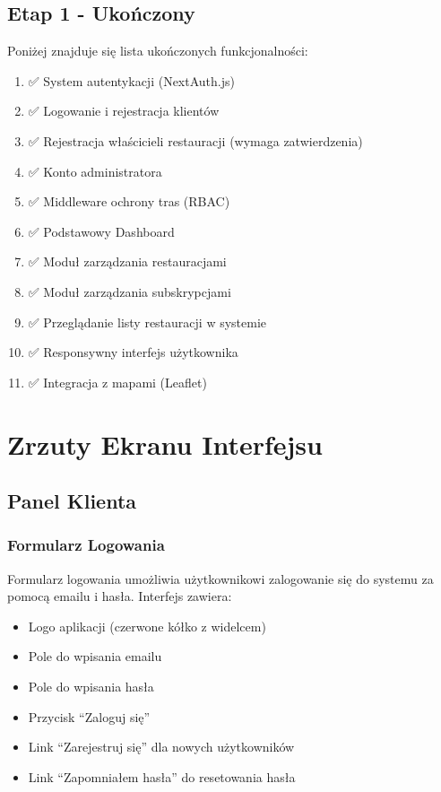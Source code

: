 ﻿\documentclass[12pt,a4paper,utf-8]{article}
\begin{document}
\subsection{Etap 1 - Ukończony}

Poniżej znajduje się lista ukończonych funkcjonalności:

\begin{enumerate}
    \item ✅ System autentykacji (NextAuth.js)
    \item ✅ Logowanie i rejestracja klientów
    \item ✅ Rejestracja właścicieli restauracji (wymaga zatwierdzenia)
    \item ✅ Konto administratora
    \item ✅ Middleware ochrony tras (RBAC)
    \item ✅ Podstawowy Dashboard
    \item ✅ Moduł zarządzania restauracjami
    \item ✅ Moduł zarządzania subskrypcjami
    \item ✅ Przeglądanie listy restauracji w systemie
    \item ✅ Responsywny interfejs użytkownika
    \item ✅ Integracja z mapami (Leaflet)


\end{enumerate}

\newpage

\section{Zrzuty Ekranu Interfejsu}

\subsection{Panel Klienta}

\subsubsection{Formularz Logowania}

Formularz logowania umożliwia użytkownikowi zalogowanie się do systemu za pomocą emailu i hasła. Interfejs zawiera:

\begin{itemize}
    \item Logo aplikacji (czerwone kółko z widelcem)
    \item Pole do wpisania emailu
    \item Pole do wpisania hasła
    \item Przycisk ``Zaloguj się''
    \item Link ``Zarejestruj się'' dla nowych użytkowników
    \item Link ``Zapomniałem hasła'' do resetowania hasła
\end{itemize}
\end{document}
